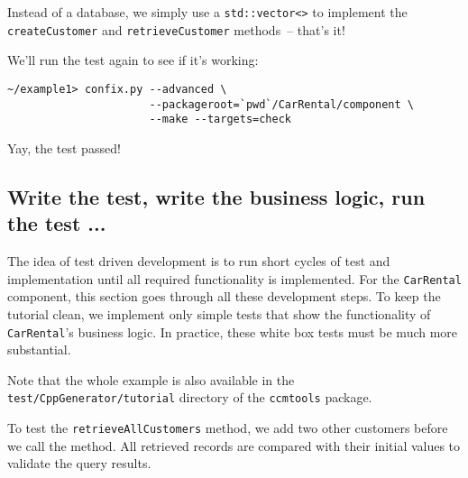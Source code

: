 Instead of a database, we simply use a {\tt std::vector<>} to implement
the {\tt createCustomer} and {\tt retrieveCustomer} methods~-- that's it! 

We'll run the test again to see if it's working:
\begin{small}
\begin{verbatim}
~/example1> confix.py --advanced \
                      --packageroot=`pwd`/CarRental/component \
                      --make --targets=check
\end{verbatim}
\end{small}

Yay, the test passed!



\subsection{Write the test, write the business logic, run the test ...}
The idea of test driven development is to run short cycles of test and
implementation until all required functionality is implemented.
For the {\tt CarRental} component, this section goes through all these 
development steps. 
To keep the tutorial clean, we implement only simple tests that show the
functionality of {\tt CarRental}'s business logic.
In practice, these white box tests must be much more substantial.

Note that the whole example is also available in the 
{\tt test/CppGenerator/tutorial} directory of the {\tt ccmtools} package. 

\newpage
To test the {\tt retrieveAllCustomers} method, we add two other customers before
we call the method. All retrieved records are compared with their initial values
to validate the query results. 

